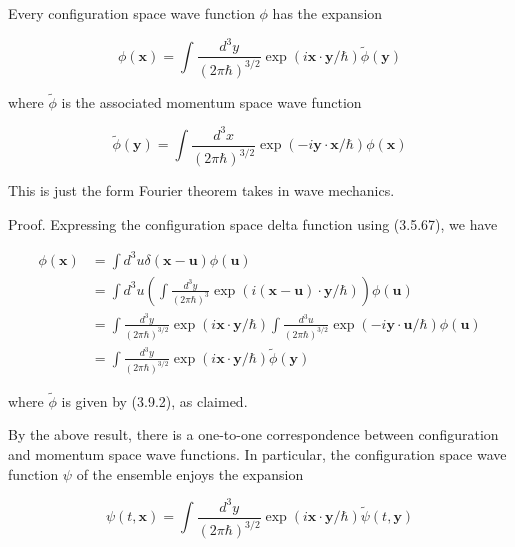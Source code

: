 \documentclass{article}
\begin{document}
Every configuration space wave function $\phi$ has the expansion
 
\begin{equation*}
\phi(\boldsymbol{x})=\int \frac{d^{3} y}{(2 \pi \hbar)^{3 / 2}} \exp (i \boldsymbol{x} \cdot \boldsymbol{y} / \hbar) \tilde{\phi}(\boldsymbol{y}) \tag{3.9.1}
\end{equation*}
 
where $\tilde{\phi}$ is the associated momentum space wave function
 
\begin{equation*}
\tilde{\phi}(\boldsymbol{y})=\int \frac{d^{3} x}{(2 \pi \hbar)^{3 / 2}} \exp (-i \boldsymbol{y} \cdot \boldsymbol{x} / \hbar) \phi(\boldsymbol{x}) \tag{3.9.2}
\end{equation*}
 

This is just the form Fourier theorem takes in wave mechanics.

Proof. Expressing the configuration space delta function using (3.5.67), we have
 
\begin{align*}
\phi(\boldsymbol{x}) & =\int d^{3} u \delta(\boldsymbol{x}-\boldsymbol{u}) \phi(\boldsymbol{u})  \tag{3.9.3}\\
& =\int d^{3} u\left(\int \frac{d^{3} y}{(2 \pi \hbar)^{3}} \exp (i(\boldsymbol{x}-\boldsymbol{u}) \cdot \boldsymbol{y} / \hbar)\right) \phi(\boldsymbol{u}) \\
& =\int \frac{d^{3} y}{(2 \pi \hbar)^{3 / 2}} \exp (i \boldsymbol{x} \cdot \boldsymbol{y} / \hbar) \int \frac{d^{3} u}{(2 \pi \hbar)^{3 / 2}} \exp (-i \boldsymbol{y} \cdot \boldsymbol{u} / \hbar) \phi(\boldsymbol{u}) \\
& =\int \frac{d^{3} y}{(2 \pi \hbar)^{3 / 2}} \exp (i \boldsymbol{x} \cdot \boldsymbol{y} / \hbar) \tilde{\phi}(\boldsymbol{y})
\end{align*}
 
where $\tilde{\phi}$ is given by (3.9.2), as claimed.

By the above result, there is a one-to-one correspondence between configuration and momentum space wave functions. In particular, the configuration space wave function $\psi$ of the ensemble enjoys the expansion
 
\begin{equation*}
\psi(t, \boldsymbol{x})=\int \frac{d^{3} y}{(2 \pi \hbar)^{3 / 2}} \exp (i \boldsymbol{x} \cdot \boldsymbol{y} / \hbar) \tilde{\psi}(t, \boldsymbol{y}) \tag{3.9.4}
\end{equation*}
 
\end{document}

